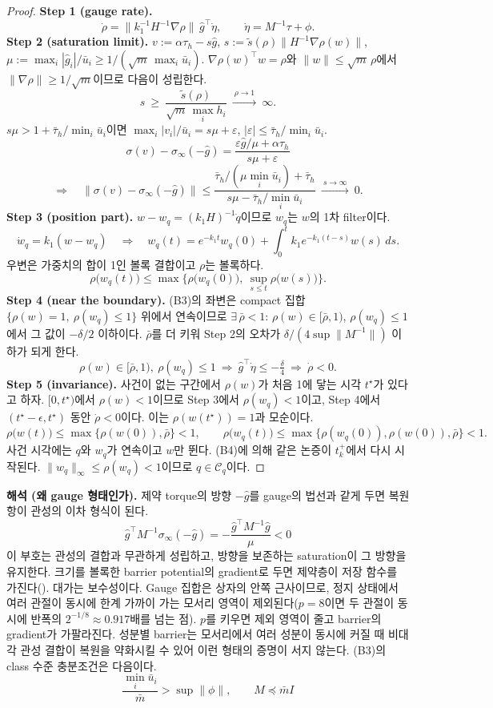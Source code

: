 \documentclass[11pt]{article}\usepackage[margin=1in]{geometry}\usepackage{amsmath,amssymb,amsthm,mathtools}\usepackage{graphicx}\graphicspath{{figures/}{../figures/}{figs/}{./}}\usepackage{enumitem}\usepackage{hyperref}\usepackage{cleveref}\usepackage{tikz}\usetikzlibrary{arrows.meta,positioning,calc,shapes.geometric}\usepackage{float}\usepackage{rotating}\usepackage[most]{tcolorbox}\usepackage{kotex}\usepackage{booktabs}\usepackage{longtable}\emergencystretch=1.6em\tolerance=2000 \crefname{assumption}{Assumption}{Assumptions}\Crefname{assumption}{Assumption}{Assumptions}\crefname{definition}{Definition}{Definitions}\Crefname{definition}{Definition}{Definitions}\crefname{proposition}{Proposition}{Propositions}\Crefname{proposition}{Proposition}{Propositions}\crefname{fact}{Fact}{Facts}\Crefname{fact}{Fact}{Facts} \newtheorem{assumption}{Assumption}\newtheorem{definition}{Definition}\newtheorem{lemma}{Lemma}\newtheorem{proposition}{Proposition}\newtheorem{theorem}{Theorem}\newtheorem{corollary}{Corollary}\newtheorem{fact}{Fact}\theoremstyle{remark}\newtheorem{remark}{Remark} \newcommand{\R}{\mathbb{R}}\newcommand{\xb}{\bar x}\newcommand{\Ab}{\bar A}\newcommand{\By}{\bar B_y}\newcommand{\U}{\mathcal U}\newcommand{\Z}{\mathcal Z}
\begin{document}
\begin{proof}
\textbf{Step 1 (gauge rate).}
\[
\dot\rho=\|k_1^{-1}H^{-1}\nabla\rho\|\,\hat g^\top\dot\eta,\qquad \dot\eta=M^{-1}\tau+\phi .
\]
\textbf{Step 2 (saturation limit).} $v:=\alpha\tau_h-s\hat g$, $s:=\tilde s(\rho)\|H^{-1}\nabla\rho(w)\|$, $\mu:=\max_i|\hat g_i|/\bar u_i\ge1/(\sqrt m\,\max_i\bar u_i)$. $\nabla\rho(w)^\top w=\rho$와 $\|w\|\le\sqrt m\,\rho$에서 $\|\nabla\rho\|\ge1/\sqrt m$이므로 다음이 성립한다.
\[
s\ \ge\ \frac{\tilde s(\rho)}{\sqrt m\,\max_ih_i}\ \xrightarrow{\ \rho\to1\ }\ \infty .
\]
$s\mu>1+\bar\tau_h/\min_i\bar u_i$이면 $\max_i|v_i|/\bar u_i=s\mu+\varepsilon$, $|\varepsilon|\le\bar\tau_h/\min_i\bar u_i$.
\[
\sigma(v)-\sigma_\infty(-\hat g)=\frac{\varepsilon\hat g/\mu+\alpha\tau_h}{s\mu+\varepsilon}
\]
\[
\Longrightarrow\quad \big\|\sigma(v)-\sigma_\infty(-\hat g)\big\|\le\frac{\bar\tau_h/(\mu\min_i\bar u_i)+\bar\tau_h}{s\mu-\bar\tau_h/\min_i\bar u_i}\ \xrightarrow{\ s\to\infty\ }\ 0 .
\]
\textbf{Step 3 (position part).} $w-w_q=(k_1H)^{-1}\dot q$이므로 $w_q$는 $w$의 1차 filter이다.
\[
\dot w_q=k_1(w-w_q)\quad\Longrightarrow\quad w_q(t)=e^{-k_1t}w_q(0)+\int_0^tk_1e^{-k_1(t-s)}w(s)\,ds .
\]
우변은 가중치의 합이 1인 볼록 결합이고 $\rho$는 볼록하다.
\[
\rho\big(w_q(t)\big)\le\max\Big\{\rho\big(w_q(0)\big),\ \sup_{s\le t}\rho\big(w(s)\big)\Big\} .
\]
\textbf{Step 4 (near the boundary).} (B3)의 좌변은 compact 집합 $\{\rho(w)=1,\ \rho(w_q)\le1\}$ 위에서 연속이므로 $\exists\,\bar\rho<1$: $\rho(w)\in[\bar\rho,1)$, $\rho(w_q)\le1$에서 그 값이 $-\delta/2$ 이하이다. $\bar\rho$를 더 키워 Step 2의 오차가 $\delta/(4\sup\|M^{-1}\|)$ 이하가 되게 한다.
\[
\rho(w)\in[\bar\rho,1),\ \rho(w_q)\le1\ \Longrightarrow\ \hat g^\top\dot\eta\le-\tfrac{\delta}{4}\ \Longrightarrow\ \dot\rho<0 .
\]
\textbf{Step 5 (invariance).} 사건이 없는 구간에서 $\rho(w)$가 처음 1에 닿는 시각 $t^\star$가 있다고 하자. $[0,t^\star)$에서 $\rho(w)<1$이므로 Step 3에서 $\rho(w_q)<1$이고, Step 4에서 $(t^\star-\epsilon,t^\star)$ 동안 $\dot\rho<0$이다. 이는 $\rho(w(t^\star))=1$과 모순이다.
\[
\rho\big(w(t)\big)\le\max\{\rho(w(0)),\bar\rho\}<1,\qquad \rho\big(w_q(t)\big)\le\max\{\rho(w_q(0)),\rho(w(0)),\bar\rho\}<1 .
\]
사건 시각에는 $q$와 $w_q$가 연속이고 $w$만 뛴다. (B4)에 의해 같은 논증이 $t_k^+$에서 다시 시작된다. $\|w_q\|_\infty\le\rho(w_q)<1$이므로 $q\in\mathcal C_q$이다.
\end{proof}

\textbf{해석 (왜 gauge 형태인가).} 제약 torque의 방향 $-\hat g$를 gauge의 법선과 같게 두면 복원 항이 관성의 이차 형식이 된다.
\[
\hat g^\top M^{-1}\sigma_\infty(-\hat g)=-\frac{\hat g^\top M^{-1}\hat g}{\mu}<0
\]
이 부호는 관성의 결합과 무관하게 성립하고, 방향을 보존하는 saturation이 그 방향을 유지한다. 크기를 볼록한 barrier potential의 gradient로 두면 제약층이 저장 함수를 가진다(). 대가는 보수성이다. Gauge 집합은 상자의 안쪽 근사이므로, 정지 상태에서 여러 관절이 동시에 한계 가까이 가는 모서리 영역이 제외된다($p=8$이면 두 관절이 동시에 반폭의 $2^{-1/8}\approx0.917$배를 넘는 점). $p$를 키우면 제외 영역이 줄고 barrier의 gradient가 가팔라진다. 성분별 barrier는 모서리에서 여러 성분이 동시에 커질 때 비대각 관성 결합이 복원을 약화시킬 수 있어 이런 형태의 증명이 서지 않는다. (B3)의 class 수준 충분조건은 다음이다.
\[
\frac{\min_i\bar u_i}{\bar m}>\sup\|\phi\|,\qquad M\preceq\bar m I
\]
\end{document}

